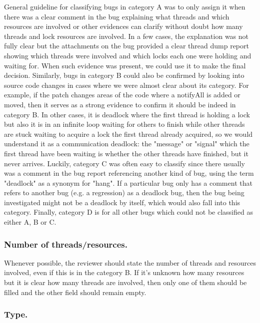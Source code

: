 General guideline for classifying bugs in category A was to only assign it when there was a clear comment in the bug explaining what threads and which resources are involved or other evidences can clarify without doubt how many threads and lock resources are involved. In a few cases, the explanation was not fully clear but the attachments on the bug provided a clear thread dump report showing which threads were involved and which locks each one were holding and waiting for. When such evidence was present, we could use it to make the final decision. Similarly, bugs in category B could also be confirmed by looking into source code changes in cases where we were almost clear about its category. For example, if the patch changes areas of the code where a notifyAll is added or moved, then it serves as a strong evidence to confirm it should be indeed in category B. In other cases, it is deadlock where the first thread is holding a lock but also it is in an infinite loop waiting for others to finish while other threads are stuck waiting to acquire a lock the first thread already acquired, so we would understand it as a communication deadlock: the "message" or "signal" which the first thread have been waiting is whether the other threads have finished, but it never arrives. Luckily, category C was often easy to classify since there usually was a comment in the bug report referencing another kind of bug, using the term "deadlock" as a synonym for "hang". If a particular bug only has a comment that refers to another bug (e.g. a regression) as a deadlock bug, then the bug being investigated might not be a deadlock by itself, which would also fall into this category. Finally, category D is for all other bugs which could not be classified as either A, B or C.


\subsubsection{Number of threads/resources.}

Whenever possible, the reviewer should state the number of threads and resources involved, even if this is in the category B. If it's unknown how many resources but it is clear how many threads are involved, then only one of them should be filled and the other field should remain empty.

\subsubsection{Type.}

